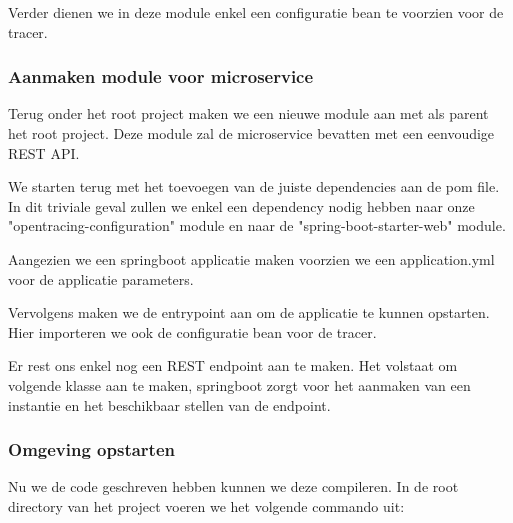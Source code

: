 Verder dienen we in deze module enkel een configuratie bean te voorzien voor de tracer.


\subsubsection{Aanmaken module voor microservice}
Terug onder het root project maken we een nieuwe module aan met als parent het root project. Deze module zal de microservice bevatten met een eenvoudige \gls{REST} \gls{API}.

We starten terug met het toevoegen van de juiste dependencies aan de pom file. In dit triviale geval zullen we enkel een dependency nodig hebben naar onze "opentracing-configuration" module en naar de "spring-boot-starter-web" module.


Aangezien we een springboot applicatie maken voorzien we een application.yml voor de applicatie parameters.


Vervolgens maken we de entrypoint aan om de applicatie te kunnen opstarten. Hier importeren we ook de configuratie bean voor de tracer.


Er rest ons enkel nog een REST endpoint aan te maken. Het volstaat om volgende klasse aan te maken, springboot zorgt voor het aanmaken van een instantie en het beschikbaar stellen van de endpoint.


\subsubsection{Omgeving opstarten}
Nu we de code geschreven hebben kunnen we deze compileren. In de root directory van het project voeren we het volgende commando uit:
\begin{list}{}{}
	\item {}
\end{list}

